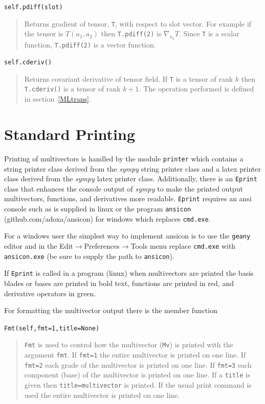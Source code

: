 \documentclass[12pt,twoside,openright]{memoir}
\newcommand{\lp}{\left (}
\newcommand{\rp}{\right )}
\newcommand{\f}[2]{{#1}\lp {#2} \rp}
\newcommand{\T}[1]{\texttt{#1}}
\begin{document}
\T{self.pdiff(slot)}
\begin{quote}
	Returns gradient of tensor, \T{T}, with respect to slot vector.  For example if the tensor is $\f{T}{a_{1},a_{2}}$ then
	\T{T.pdiff(2)} is $\nabla_{a_{2}}T$.  Since \T{T} is a scalar function, \T{T.pdiff(2)} is a vector function.
\end{quote}

\T{self.cderiv()}
\begin{quote}
	Returns covariant derivative of tensor field. If \T{T} is a tensor of rank $k$ then \T{T.cderiv()} is a tensor of rank $k+1$.
	The operation performed is defined in section~\ref{MLtrans}.
\end{quote}

\section{Standard Printing}

Printing of multivectors is handled by the module \T{printer} which contains
a string printer class derived from the \emph{sympy} string printer class and a latex
printer class derived from the \emph{sympy} latex printer class.  Additionally, there
is an \T{Eprint} class that enhances the console output of \emph{sympy} to make
the printed output multivectors, functions, and derivatives more readable.
\T{Eprint} requires an ansi console such as is supplied in linux or the
program \T{ansicon} (github.com/adoxa/ansicon) for windows which replaces \T{cmd.exe}.

For a windows user the simplest way to implement ansicon is to use the \T{geany}
editor and in the Edit$\rightarrow$Preferences$\rightarrow$Tools menu replace \T{cmd.exe} with
\T{ansicon.exe} (be sure to supply the path to \T{ansicon}).

If \T{Eprint} is called in a program (linux) when multivectors are printed
the basis blades or bases are printed in bold text, functions are printed in red,
and derivative operators in green.

For formatting the multivector output there is the member function

\T{Fmt(self,fmt=1,title=None)}
\begin{quote}
\T{Fmt} is used to control how the multivector (\T{Mv}) is printed with the argument
\T{fmt}.  If \T{fmt=1} the entire multivector is printed on one line.  If
\T{fmt=2} each grade of the multivector is printed on one line.  If \T{fmt=3}
each component (base) of the multivector is printed on one line.  If a
\T{title} is given then \T{title=multivector} is printed.  If the usual print
command is used the entire multivector is printed on one line.
\end{quote}
\end{document}
